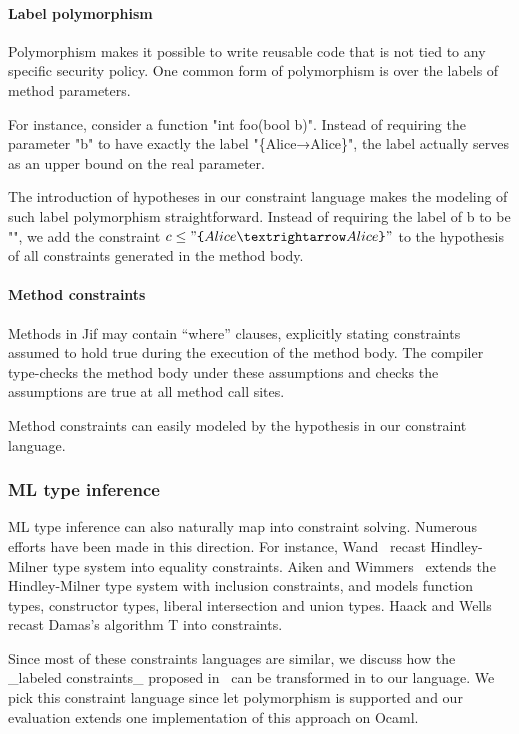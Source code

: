 \paragraph{Label polymorphism}

Polymorphism makes it possible to write reusable code that is not tied
to any specific security policy. One common form of polymorphism is
over the labels of method parameters. 

For instance, consider a function "int foo(bool b)".
Instead of requiring the parameter "b" to have exactly the label
"\{Alice→Alice\}", the label actually serves as an upper bound on the
real parameter.

The introduction of hypotheses in our constraint language makes the
modeling of such label polymorphism straightforward. Instead of
requiring the label of b to
be "", we add the constraint $c\leq
"\lab{Alice→Alice}"$ to the hypothesis of all constraints generated in the
method body.

\paragraph{Method constraints}

Methods in Jif may contain ``where'' clauses, explicitly stating
constraints assumed to hold true during the execution of the method
body. The compiler type-checks the method body under these assumptions
and checks the assumptions are true at all method call sites. 

Method constraints can easily modeled by the hypothesis in our
constraint language.
 
\subsubsection{ML type inference}

ML type inference can also naturally map into constraint solving. Numerous 
efforts have been made in this direction. For instance,
Wand~\cite{wand-typeinference} recast Hindley-Milner type system into equality
constraints. Aiken and Wimmers~\cite{aiken-typeinclusion} extends the
Hindley-Milner type system with inclusion constraints, and models function
types, constructor types, liberal intersection and union types. Haack and Wells
~\cite{haack:slicing} recast Damas’s algorithm T into constraints.

Since most of these constraints languages are similar, we discuss how the
_labeled constraints_ proposed in~\cite{haack:slicing} can be transformed in to
our language. We pick this constraint language since let polymorphism is
supported and our evaluation extends one implementation of this approach on
Ocaml.

